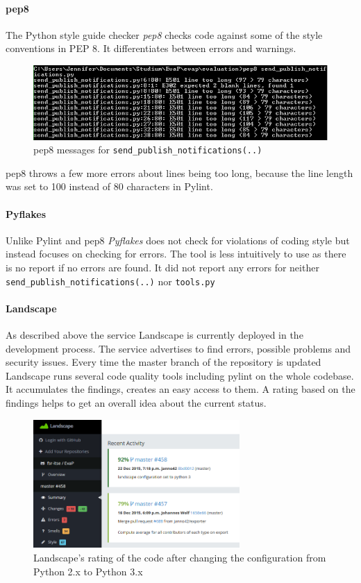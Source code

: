 \paragraph{pep8}
The Python style guide checker \emph{pep8} checks code against some of the style conventions in PEP 8.
It differentiates between errors and warnings.
\begin{figure}[h]
    \centering
    \includegraphics[width=\textwidth, keepaspectratio]{graphics/pep8_send_publish_notifications_1}
    \caption{pep8 messages for \texttt{send\_publish\_notifications(..)}}
    \label{fig:pep8}
\end{figure} 
pep8 throws a few more errors about lines being too long, because the line length was set to 100 instead of 80 characters in Pylint.

\paragraph{Pyflakes}
Unlike Pylint and pep8 \emph{Pyflakes} does not check for violations of coding style but instead focuses on checking for errors.
The tool is less intuitively to use as there is no report if no errors are found. 
It did not report any errors for neither \texttt{send\_publish\_notifications(..)} nor \texttt{tools.py}

\paragraph{Landscape}
As described above the service Landscape is currently deployed in the development process. 
The service advertises to find errors, possible problems and security issues.
Every time the master branch of the repository is updated Landscape runs several code quality tools including pylint on the whole codebase. 
It accumulates the findings, creates an easy access to them.
A rating based on the findings helps to get an overall idea about the current status.

\begin{figure}[h]
    \centering
    \includegraphics[width=0.7\textwidth, keepaspectratio]{graphics/landscape_python3}
    \caption{Landscape's rating of the code after changing the configuration from Python 2.x to Python 3.x}
    \label{fig:landscape_python3}
\end{figure} 

